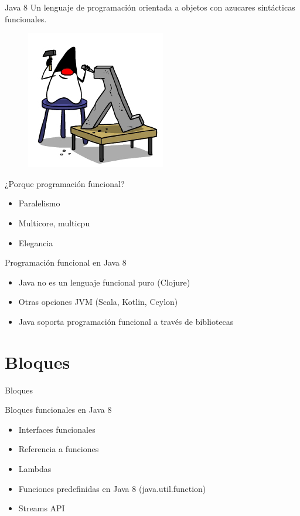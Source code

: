 \documentclass{beamer}
\begin{document}
\begin{frame}{Java 8}
Un lenguaje de programación orientada a objetos con azucares sintácticas funcionales.
			\begin{figure}
			\centering
			\includegraphics[width=0.5\linewidth]{Images/JavaLam-1}
			\end{figure}
\end{frame}

\begin{frame}{¿Porque programación funcional?}
	\begin{itemize}
	\item Paralelismo
	\item Multicore, multicpu
	\item Elegancia
	\end{itemize}
\end{frame}

\begin{frame}{Programación funcional en Java 8}
	\begin{itemize}
	\item Java no es un lenguaje funcional puro (Clojure)
	\item Otras opciones JVM (Scala, Kotlin, Ceylon)
	\item Java soporta programación funcional a través de bibliotecas
	\end{itemize}
\end{frame}

\section{Bloques}
\begin{frame}
\huge Bloques
\end{frame}

\begin{frame}{Bloques funcionales en Java 8}
	\begin{itemize}
	\item Interfaces funcionales
	\item Referencia a funciones
	\item Lambdas
	\item Funciones predefinidas en Java 8 (java.util.function)
	\item Streams API
	\end{itemize}
\end{frame}
\end{document}
